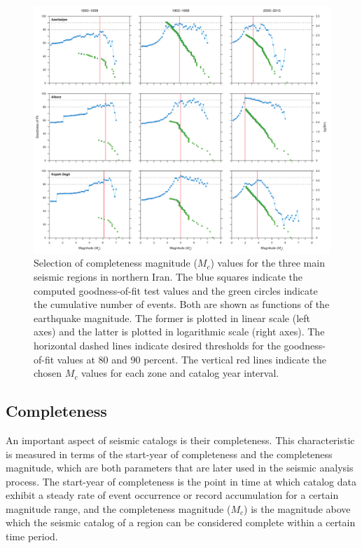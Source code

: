 \begin{figure}[t]
    \centering
    \includegraphics[width=\textwidth]{figures/pdf/figure-06.pdf}
    \caption{Selection of completeness magnitude ($M_c$) values for the three main seismic regions in northern Iran. The blue squares indicate the computed goodness-of-fit test values and the green circles indicate the cumulative number of events. Both are shown as functions of the earthquake magnitude. The former is plotted in linear scale (left axes) and the latter is plotted in logarithmic scale (right axes). The horizontal dashed lines indicate desired thresholds for the goodness-of-fit values at 80 and 90 percent. The vertical red lines indicate the chosen $M_c$ values for each zone and catalog year interval.}
    \label{fig:mc}
\end{figure}

\subsection{Completeness}

An important aspect of seismic catalogs is their completeness. This characteristic is measured in terms of the start-year of completeness and the completeness magnitude, which are both parameters that are later used in the seismic analysis process. The start-year of completeness is the point in time at which catalog data exhibit a steady rate of event occurrence or record accumulation for a certain magnitude range, and the completeness magnitude ($M_c$) is the magnitude above which the seismic catalog of a region can be considered complete within a certain time period. 

